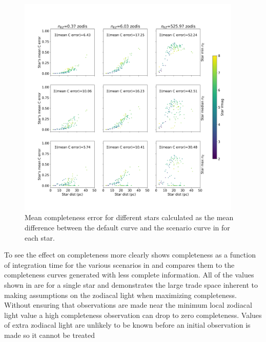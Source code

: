 \begin{figure}
  \begin{center}
    \includegraphics[width=0.95\textwidth]{ch3/figures/mean_comp_errors.png}
  \end{center}
  \caption{Mean completeness error for different stars calculated as the mean difference between
  the default curve and the scenario curve in  for each star.}
  \label{fig:mean_comp_errors}
\end{figure}

To see the effect on completeness more clearly  shows
completeness as a function of integration time for the various scenarios in
 and compares them to the completeness curves generated
with less complete information. All of the values shown in
 are for a
single star and demonstrates the large trade space inherent to making
assumptions on the zodiacal light when maximizing completeness. Without
ensuring that observations are made near the minimum local zodiacal light value
a high completeness observation can drop to zero completeness. Values of extra
zodiacal light are unlikely to be known before an initial observation is made
so it cannot be treated 

